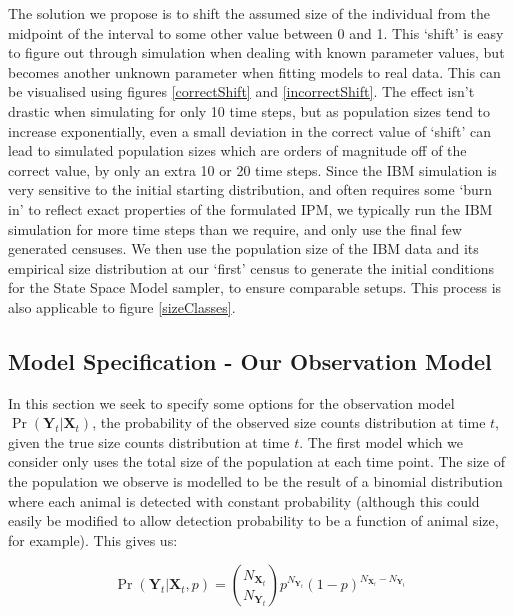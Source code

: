\documentclass[a4paper,12pt]{article}
\begin{document}
The solution we propose is to shift the assumed size of the individual from the midpoint of the interval to some other value between 0 and 1. This `shift' is easy to figure out through simulation when dealing with known parameter values, but becomes another unknown parameter when fitting models to real data. This can be visualised using figures \ref{correctShift} and \ref{incorrectShift}. The effect isn't drastic when simulating for only 10 time steps, but as population sizes tend to increase exponentially, even a small deviation in the correct value of `shift' can lead to simulated population sizes which are orders of magnitude off of the correct value, by only an extra 10 or 20 time steps. Since the IBM simulation is very sensitive to the initial starting distribution, and often requires some `burn in' to reflect exact properties of the formulated IPM, we typically run the IBM simulation for more time steps than we require, and only use the final few generated censuses. We then use the population size of the IBM data and its empirical size distribution at our `first' census to generate the initial conditions for the State Space Model sampler, to ensure comparable setups. This process is also applicable to figure \ref{sizeClasses}.\\

\subsection{Model Specification - Our Observation Model}

In this section we seek to specify some options for the observation model $\Pr(\boldsymbol{Y}_t|\boldsymbol{X}_t)$, the probability of the observed size counts distribution at time $t$, given the true size counts distribution at time $t$. The first model which we consider only uses the total size of the population at each time point. The size of the population we observe is modelled to be the result of a binomial distribution where each animal is detected with constant probability (although this could easily be modified to allow detection probability to be a function of animal size, for example). This gives us:

\begin{equation}
    \Pr(\boldsymbol{Y}_t|\boldsymbol{X}_t, p) = {N_{\boldsymbol{X}_t} \choose N_{\boldsymbol{Y}_t}} p^{N_{\boldsymbol{Y}_t}}(1-p)^{N_{\boldsymbol{X}_t} - N_{\boldsymbol{Y}_t}}
\end{equation}
\end{document}

